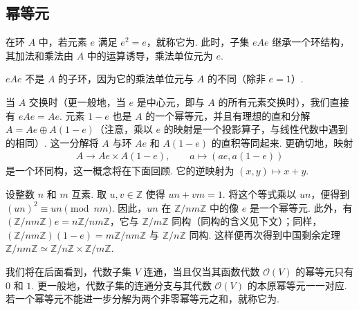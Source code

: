 \subsection{幂等元}\label{sec:galois-1-2-6}
在环 $A$ 中，若元素 $e$ 满足 $e^2=e$，就称它为.
此时，子集 $eAe$ 继承一个环结构，其加法和乘法由 $A$ 中的运算诱导，乘法单位元为 $e$.
\begin{remark*}
$eAe$ 不是 $A$ 的子环，因为它的乘法单位元与 $A$ 的不同（除非 $e=1$）.
\end{remark*}
当 $A$ 交换时（更一般地，当 $e$ 是中心元，即与 $A$ 的所有元素交换时），我们直接有 $eAe=Ae$.
元素 $1-e$ 也是 $A$ 的一个幂等元，并且有理想的直和分解
$A=Ae\oplus A(1-e)$（注意，乘以 $e$ 的映射是一个投影算子，与线性代数中遇到的相同）.
这一分解将 $A$ 与环 $Ae$ 和 $A(1-e)$ 的直积等同起来.
更确切地，映射
\begin{align*}
A\longrightarrow Ae\times A(1-e),\qquad a\longmapsto(ae,a(1-e))
\end{align*}
是一个环同构，这一概念将在下面回顾. 它的逆映射为 $(x,y)\longmapsto x+y$.
\begin{example*}
设整数 $n$ 和 $m$ 互素. 取 $u,v\in\mathbb Z$ 使得 $un+vm=1$.
将这个等式乘以 $un$，便得到 $(un)^2\equiv un\pmod{nm}$.
因此，$un$ 在 $\mathbb Z/nm\mathbb Z$ 中的像 $e$ 是一个幂等元.
此外，有
$(\mathbb Z/nm\mathbb Z)e=n\mathbb Z/nm\mathbb Z$，它与 $\mathbb Z/m\mathbb Z$ 同构（同构的含义见下文）；同样，
$(\mathbb Z/nm\mathbb Z)(1-e)=m\mathbb Z/nm\mathbb Z$ 与 $\mathbb Z/n\mathbb Z$ 同构.
这样便再次得到中国剩余定理
$\mathbb Z/nm\mathbb Z\simeq\mathbb Z/n\mathbb Z\times\mathbb Z/m\mathbb Z$.
\end{example*}
\begin{remark*}[{几何解释}]
我们将在后面看到，代数子集 $V$ 连通，当且仅当其函数代数 $\mathcal O(V)$ 的幂等元只有 $0$ 和 $1$.
更一般地，代数子集的连通分支与其代数 $\mathcal O(V)$ 的本原幂等元一一对应.
若一个幂等元不能进一步分解为两个非零幂等元之和，就称它为.
\end{remark*}

